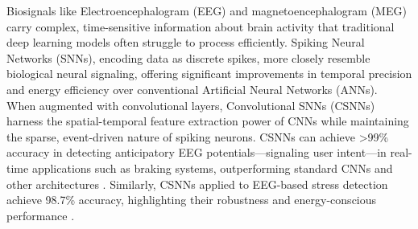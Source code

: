 \noindent Biosignals like Electroencephalogram (EEG) and magnetoencephalogram (MEG) carry complex, time-sensitive information about brain activity that traditional deep learning models often struggle to process efficiently. Spiking Neural Networks (SNNs), encoding data as discrete spikes, more closely resemble biological neural signaling, offering significant improvements in temporal precision and energy efficiency over conventional Artificial Neural Networks (ANNs).\\


\noindent When augmented with convolutional layers, Convolutional SNNs (CSNNs) harness the spatial-temporal feature extraction power of CNNs while maintaining the sparse, event-driven nature of spiking neurons. CSNNs can achieve >99\% accuracy in detecting anticipatory EEG potentials—signaling user intent—in real-time applications such as braking systems, outperforming standard CNNs and other architectures \cite{lutes2024convolutional}. Similarly, CSNNs applied to EEG-based stress detection achieve 98.7\% accuracy, highlighting their robustness and energy-conscious performance \cite{Joshi2025-sa}.\\


